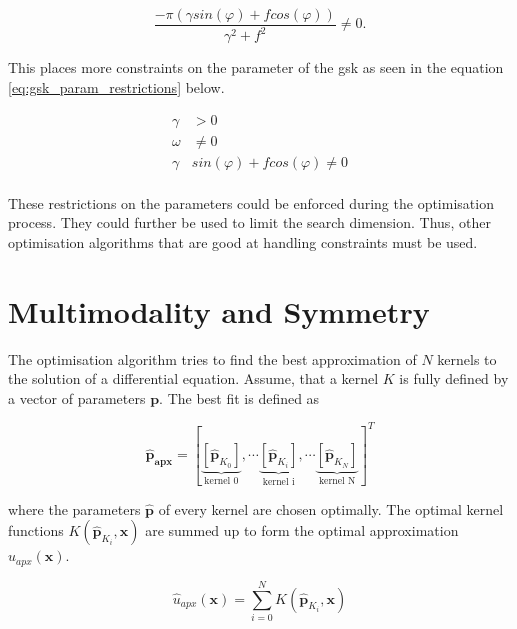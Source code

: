 \documentclass[./\jobname.tex]{subfiles}
\begin{document}
\begin{equation}
	\frac{-\pi (\gamma sin(\varphi) + f cos(\varphi))}{\gamma^2 + f^2} \neq 0.
\end{equation}

This places more constraints on the parameter of the \gls{gsk} as seen in the equation \eqref{eq:gsk_param_restrictions} below. 

\begin{equation}
\label{eq:gsk_param_restrictions}
	\begin{split}
	\gamma & > 0 \\
	\omega & \neq 0 \\
	\gamma & sin(\varphi) + f cos(\varphi) \neq 0 \\
	\end{split}
\end{equation}

These restrictions on the parameters could be enforced during the optimisation process. They could further be used to limit the search dimension. Thus, other optimisation algorithms that are good at handling constraints must be used. 

\section{Multimodality and Symmetry}
\label{chap:multimodality_and_symmetry}

The optimisation algorithm tries to find the best approximation of $N$ kernels to the solution of a differential equation. Assume, that a kernel $K$ is fully defined by a vector of parameters $\mathbf{p}$. The best fit is defined as 

\begin{equation}
\mathbf{\hat{p}_{apx}} = \left[\underbrace{\left[ \mathbf{\hat{p}}_{K_0} \right] }_{\text{kernel 0}}, \cdots \underbrace{\left[ \mathbf{\hat{p}}_{K_i} \right] }_{\text{kernel i}}, \cdots \underbrace{\left[ \mathbf{\hat{p}}_{K_N} \right]}_{\text{kernel N}} \right]^T
\end{equation}

where the parameters $\mathbf{\hat{p}}$ of every kernel are chosen optimally. The optimal kernel functions $K(\mathbf{\hat{p}}_{K_i}, \mathbf{x})$ are summed up to form the optimal approximation $\hat{u}_{apx}(\mathbf{x})$. 

\begin{equation}
\label{eq:uapx_kernel_sum}
\hat{u}_{apx}(\mathbf{x}) = \sum_{i=0}^{N} K(\mathbf{\hat{p}}_{K_i}, \mathbf{x})
\end{equation}
\end{document}
